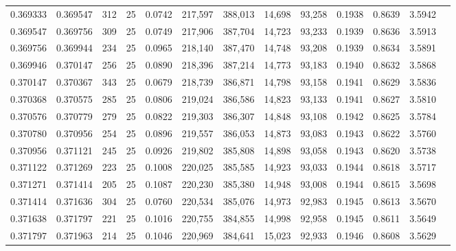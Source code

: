\begin{tabular}{rrrrrrrrrrrrr}
0.369333 & 0.369547 &   312 &  25 &                                     0.0742 & 217,597 & 388,013 &  14,698 &  93,258 & 0.1938 & 0.8639 & 3.5942 \\
0.369547 & 0.369756 &   309 &  25 &                                     0.0749 & 217,906 & 387,704 &  14,723 &  93,233 & 0.1939 & 0.8636 & 3.5913 \\
0.369756 & 0.369944 &   234 &  25 &                                     0.0965 & 218,140 & 387,470 &  14,748 &  93,208 & 0.1939 & 0.8634 & 3.5891 \\
0.369946 & 0.370147 &   256 &  25 &                                     0.0890 & 218,396 & 387,214 &  14,773 &  93,183 & 0.1940 & 0.8632 & 3.5868 \\
0.370147 & 0.370367 &   343 &  25 &                                     0.0679 & 218,739 & 386,871 &  14,798 &  93,158 & 0.1941 & 0.8629 & 3.5836 \\
0.370368 & 0.370575 &   285 &  25 &                                     0.0806 & 219,024 & 386,586 &  14,823 &  93,133 & 0.1941 & 0.8627 & 3.5810 \\
0.370576 & 0.370779 &   279 &  25 &                                     0.0822 & 219,303 & 386,307 &  14,848 &  93,108 & 0.1942 & 0.8625 & 3.5784 \\
0.370780 & 0.370956 &   254 &  25 &                                     0.0896 & 219,557 & 386,053 &  14,873 &  93,083 & 0.1943 & 0.8622 & 3.5760 \\
0.370956 & 0.371121 &   245 &  25 &                                     0.0926 & 219,802 & 385,808 &  14,898 &  93,058 & 0.1943 & 0.8620 & 3.5738 \\
0.371122 & 0.371269 &   223 &  25 &                                     0.1008 & 220,025 & 385,585 &  14,923 &  93,033 & 0.1944 & 0.8618 & 3.5717 \\
0.371271 & 0.371414 &   205 &  25 &                                     0.1087 & 220,230 & 385,380 &  14,948 &  93,008 & 0.1944 & 0.8615 & 3.5698 \\
0.371414 & 0.371636 &   304 &  25 &                                     0.0760 & 220,534 & 385,076 &  14,973 &  92,983 & 0.1945 & 0.8613 & 3.5670 \\
0.371638 & 0.371797 &   221 &  25 &                                     0.1016 & 220,755 & 384,855 &  14,998 &  92,958 & 0.1945 & 0.8611 & 3.5649 \\
0.371797 & 0.371963 &   214 &  25 &                                     0.1046 & 220,969 & 384,641 &  15,023 &  92,933 & 0.1946 & 0.8608 & 3.5629 \\

\end{tabular}
